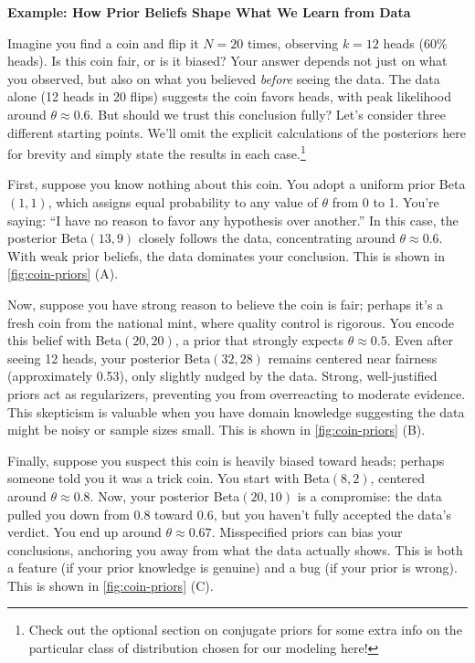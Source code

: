 \begin{exampleBox}
    \textbf{Example: How Prior Beliefs Shape What We Learn from Data}
    
    Imagine you find a coin and flip it $N=20$ times, observing $k=12$ heads (60\% heads). Is this coin fair, or is it biased? Your answer depends not just on what you observed, but also on what you believed \emph{before} seeing the data. The data alone (12 heads in 20 flips) suggests the coin favors heads, with peak likelihood around $\theta \approx 0.6$. But should we trust this conclusion fully? Let's consider three different starting points. We'll omit the explicit calculations of the posteriors here for brevity and simply state the results in each case.\footnote{Check out the optional section on conjugate priors for some extra info on the particular class of distribution chosen for our modeling here!}
    
    First, suppose you know nothing about this coin. You adopt a uniform prior Beta$(1,1)$, which assigns equal probability to any value of $\theta$ from 0 to 1. You're saying: ``I have no reason to favor any hypothesis over another.'' In this case, the posterior Beta$(13,9)$ closely follows the data, concentrating around $\theta \approx 0.6$. With weak prior beliefs, the data dominates your conclusion. This is shown in \autoref{fig:coin-priors} (A).
    
    Now, suppose you have strong reason to believe the coin is fair; perhaps it's a fresh coin from the national mint, where quality control is rigorous. You encode this belief with Beta$(20,20)$, a prior that strongly expects $\theta \approx 0.5$. Even after seeing 12 heads, your posterior Beta$(32,28)$ remains centered near fairness (approximately 0.53), only slightly nudged by the data. Strong, well-justified priors act as regularizers, preventing you from overreacting to moderate evidence. This skepticism is valuable when you have domain knowledge suggesting the data might be noisy or sample sizes small. This is shown in \autoref{fig:coin-priors} (B).
    
    Finally, suppose you suspect this coin is heavily biased toward heads; perhaps someone told you it was a trick coin. You start with Beta$(8,2)$, centered around $\theta \approx 0.8$. Now, your posterior Beta$(20,10)$ is a compromise: the data pulled you down from 0.8 toward 0.6, but you haven't fully accepted the data's verdict. You end up around $\theta \approx 0.67$. Misspecified priors can bias your conclusions, anchoring you away from what the data actually shows. This is both a feature (if your prior knowledge is genuine) and a bug (if your prior is wrong). This is shown in \autoref{fig:coin-priors} (C).
    

\end{exampleBox}
